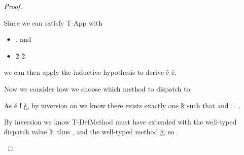 \begin{lemma}
\begin{proof}
\begin{case}[B-BetaMulti]
\begin{itemize}
\begin{subcase}[T-App]
         Since we can satisfy T-App with
       \begin{itemize}
         \item
         , and
         \item
  \judgementrewrite {\propenv{}} {\v{2}} {\s{}}
             {
                         {}}
                       {}
                       {\v{2}}.
       \end{itemize}
       we can then apply the inductive hypothesis
       to derive
  \judgementrewrite {\propenv{}} {\v{e}} 
  {
              {}
              {\x{}}}
             {
                         {}
                         {\x{}}}
                       {\replacefor
                         {}
                         {}
                         {\x{}}}
                       {\v{e}}.

 Now we consider how we choose which method to dispatch to.

 As 
  \getmethod {\disptable{}}
             {\v{e}}
             {\v{l}}
             {\v{g}}, by inversion on \getmethodliteral
             we know
   there exists exactly one \v{k} such that 
    and  = {\true{}}.

   By inversion we know T-DefMethod must have extended \disptable{} 
   with the well-typed dispatch value \v{k},
   thus {}, and
   the well-typed method \v{g},
   so {}.


\end{subcase}
\end{itemize}
\end{case}
\end{proof}
\end{lemma}
